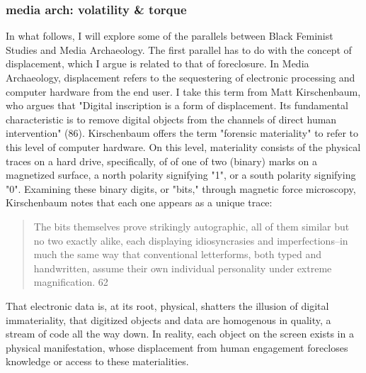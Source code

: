 \documentclass[11pt]{article}
\begin{document}
\subsubsection{media arch: volatility \& torque}
\label{sec:orgc3f22d7}
In what follows, I will explore some of the parallels between Black
Feminist Studies and Media Archaeology. The first parallel has to do
with the concept of displacement, which I argue is related to that of
foreclosure. In Media Archaeology, displacement refers to the
sequestering of electronic processing and computer hardware from the
end user. I take this term from Matt Kirschenbaum, who argues that
"Digital inscription is a form of displacement. Its fundamental
characteristic is to remove digital objects from the channels of
direct human intervention" (86). Kirschenbaum offers the term
"forensic materiality" to refer to this level of computer hardware. On
this level, materiality consists of the physical traces on a hard
drive, specifically, of of one of two (binary) marks on a magnetized
surface, a north polarity signifying "1", or a south polarity
signifying "0". Examining these binary digits, or "bits," through
magnetic force microscopy, Kirschenbaum notes that each one appears as
a unique trace:
\begin{quote}
The bits themselves prove strikingly autographic, all of them similar
but no two exactly alike, each displaying idiosyncrasies and
imperfections--in much the same way that conventional letterforms,
both typed and handwritten, assume their own individual personality
under extreme magnification. 62
\end{quote}
That electronic data is, at its root, physical, shatters the illusion
of digital immateriality, that digitized objects and data are
homogenous in quality, a stream of code all the way down. In reality,
each object on the screen exists in a physical manifestation, whose
displacement from human engagement forecloses knowledge or access to
these materialities.
\end{document}
